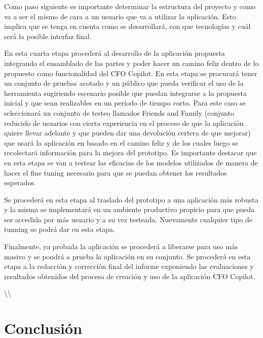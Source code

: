 \documentclass[12pt,letterpaper,oneside]{report}
\renewcommand{\_}{\UnderscoreOriginal\allowbreak}
\begin{document}
Como paso siguiente es importante determinar la estructura del proyecto y como va a ser el mismo de cara a un usuario que va a utilizar la aplicación. Esto implica que se tenga en cuenta como se desarrollará, con que tecnologías y cuál será la posible interfaz final.

En esta cuarta etapa procederá al desarrollo de la aplicación propuesta integrando el ensamblado de las partes y poder hacer un camino feliz dentro de lo propuesto como funcionalidad del CFO Copilot. En esta etapa se procurará tener un conjunto de pruebas acotado y un público que pueda verificar el uso de la herramienta sugiriendo escenario posible que puedan integrarse a la propuesta inicial y que sean realizables en un período de tiempo corto. Para este caso se seleccionará un conjunto de testeo llamados Friends and Family (conjunto reducido de usuarios con cierta experiencia en el proceso de que la aplicación quiere llevar adelante y que pueden dar una devolución certera de que mejorar) que usará la aplicación en basado en el camino feliz y de los cuales luego se recolectará información para la mejora del prototipo. Es importante destacar que en esta etapa se van a testear las eficacias de los modelos utilizados de manera de hacer el fine tuning necesario para que se puedan obtener los resultados esperados.

Se procederá en esta etapa al traslado del prototipo a una aplicación más robusta y la misma se implementará en un ambiente productivo propicio para que pueda ser accedida por más usuario y a su vez testeada. Nuevamente cualquier tipo de tunning se podrá dar en esta etapa.

Finalmente, ya probada la aplicación se procederá a liberarse para uso más masivo y se pondrá a prueba la aplicación en su conjunto. Se procederá en esta etapa a la redacción y corrección final del informe exponiendo las evaluaciones y resultados obtenidos del proceso de creación y uso de la aplicación CFO Copilot.

\textbackslash{}\textbackslash{}

\chapter{Conclusión}
%
\end{document}
